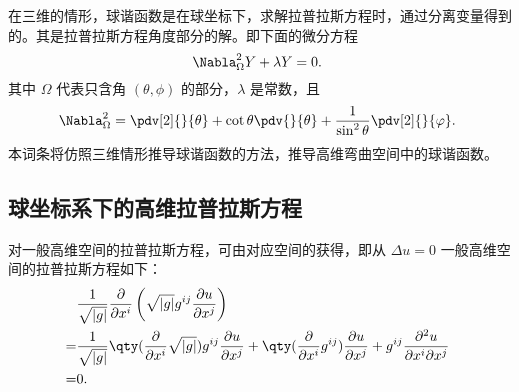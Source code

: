 

在三维的情形，球谐函数是在球坐标下，求解拉普拉斯方程时，通过分离变量得到的。其是拉普拉斯方程角度部分的解。即下面的微分方程
\begin{equation}
\Nabla_\Omega^2 Y+\lambda Y=0.~
\end{equation}
其中 $\Omega$ 代表只含角 $(\theta,\phi)$ 的部分，$\lambda$ 是常数，且
\begin{equation}
\Nabla^2_\Omega=\pdv[2]{}{\theta}+\cot\theta\pdv{}{\theta}+\frac{1}{\sin^2\theta}\pdv[2]{}{\varphi}.~
\end{equation}
本词条将仿照三维情形推导球谐函数的方法，推导高维弯曲空间中的球谐函数。

\subsection{球坐标系下的高维拉普拉斯方程}
对一般高维空间的拉普拉斯方程，可由对应空间的获得，即从 $\Delta u=0$ 一般高维空间的拉普拉斯方程如下：
\begin{equation}\label{eq_HDsphF_2}
\begin{aligned}
&\frac{1}{\sqrt{ \left\lvert g \right\rvert }} \frac{\partial }{\partial x^i} \left(\sqrt{ \left\lvert g \right\rvert }g^{ij} \frac{\partial u}{\partial x^j} \right)\\
=&\frac{1}{\sqrt{ \left\lvert g \right\rvert }} \qty(\frac{\partial }{\partial x^i} \sqrt{ \left\lvert g \right\rvert })g^{ij} \frac{\partial u}{\partial x^j}+\qty(\frac{\partial }{\partial x^i} g^{ij}) \frac{\partial u}{\partial x^j}+g^{ij}\frac{\partial^2 u}{\partial x^i\partial x^j}\\
=&0 .
\end{aligned}~
\end{equation}

